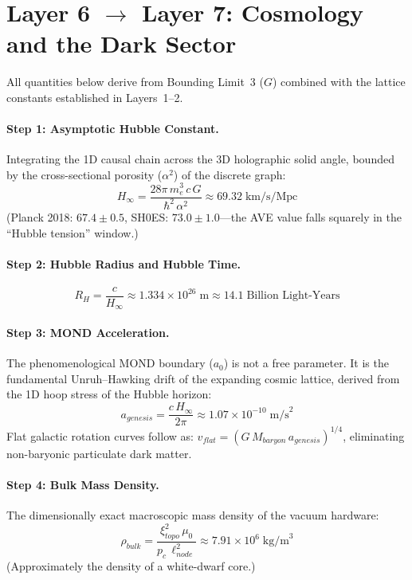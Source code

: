 \section{Layer 6 $\to$ Layer 7: Cosmology and the Dark Sector}
\label{sec:layer67}

All quantities below derive from Bounding Limit~3 ($G$) combined with the
lattice constants established in Layers~1--2.

\paragraph{Step 1: Asymptotic Hubble Constant.}
Integrating the 1D causal chain across the 3D holographic solid angle, bounded
by the cross-sectional porosity ($\alpha^2$) of the discrete graph:
\begin{equation}
    H_\infty
    = \frac{28\pi\,m_e^3\,c\,G}{\hbar^2\,\alpha^2}
    \approx 69.32\;\text{km/s/Mpc}
    \label{eq:H_inf}
\end{equation}
(Planck 2018: $67.4 \pm 0.5$, SH0ES: $73.0 \pm 1.0$---the AVE
value falls squarely in the ``Hubble tension'' window.)

\paragraph{Step 2: Hubble Radius and Hubble Time.}
\begin{equation}
    R_H = \frac{c}{H_\infty}
    \approx 1.334 \times 10^{26}\;\text{m}
    \approx 14.1\;\text{Billion Light-Years}
    \label{eq:RH}
\end{equation}

\paragraph{Step 3: MOND Acceleration.}
The phenomenological MOND boundary ($a_0$) is not a free parameter. It is the
fundamental Unruh--Hawking drift of the expanding cosmic lattice, derived from
the 1D hoop stress of the Hubble horizon:
\begin{equation}
    a_{genesis}
    = \frac{c\,H_\infty}{2\pi}
    \approx 1.07 \times 10^{-10}\;\text{m/s}^2
    \label{eq:a0}
\end{equation}
Flat galactic rotation curves follow as:
$v_{flat} = (G\,M_{baryon}\,a_{genesis})^{1/4}$, eliminating non-baryonic
particulate dark matter.

\paragraph{Step 4: Bulk Mass Density.}
The dimensionally exact macroscopic mass density of the vacuum hardware:
\begin{equation}
    \rho_{bulk}
    = \frac{\xi_{topo}^2\,\mu_0}{p_c\,\ell_{node}^2}
    \approx 7.91 \times 10^{6}\;\text{kg/m}^3
    \label{eq:rho_bulk}
\end{equation}
(Approximately the density of a white-dwarf core.)

